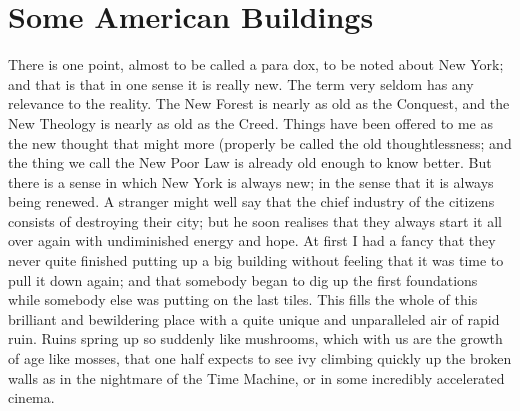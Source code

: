 \documentclass{book}
\begin{document}
\chapter{Some American Buildings}
\label{chapter-4}
There is one point, almost to be called a para dox, to be noted about New York; and that is that in one sense it is really new. The term very seldom has any relevance to the reality. The New Forest is nearly as old as the Conquest, and the New Theology is nearly as old as the Creed. Things have been offered to me as the new thought that might more (properly be called the old thoughtlessness; and the thing we call the New Poor Law is already old enough to know better. But there is a sense in which New York is always new; in the sense that it is always being renewed. A stranger might well say that the chief industry of the citizens consists of destroying their city; but he soon realises that they always start it all over again with undiminished energy and hope. At first I had a fancy that they never quite finished putting up a big building without feeling that it was time to pull it down again; and that somebody began to dig up the first foundations while somebody else was putting on the last tiles. This fills the whole of this brilliant and bewildering place with a quite unique and unparalleled air of rapid ruin. Ruins spring up so suddenly like mushrooms, which with us are the growth of age like mosses, that one half expects to see ivy climbing quickly up the broken walls as in the nightmare of the Time Machine, or in some incredibly accelerated cinema.
\end{document}
